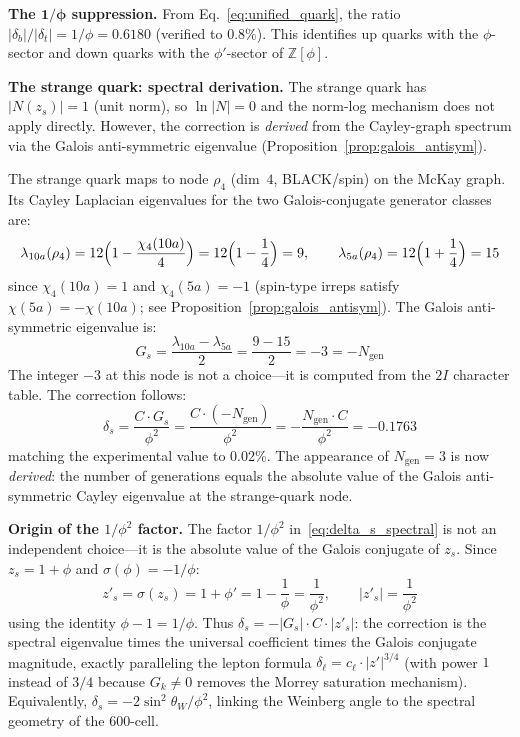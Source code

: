 \documentclass[12pt,a4paper]{article}
\theoremstyle{definition}
\begin{document}
\textbf{The $\mathbf{1/\phi}$ suppression.} From Eq.~\eqref{eq:unified_quark}, the ratio $|\delta_b|/|\delta_t| = 1/\phi = 0.6180$ (verified to $0.8\%$).  This identifies up quarks with the $\phi$-sector and down quarks with the $\phi'$-sector of $\mathbb{Z}[\phi]$.

\textbf{The strange quark: spectral derivation.} The strange quark has $|N(z_s)| = 1$ (unit norm), so $\ln|N| = 0$ and the norm-log mechanism does not apply directly.  However, the correction is \emph{derived} from the Cayley-graph spectrum via the Galois anti-symmetric eigenvalue (Proposition~\ref{prop:galois_antisym}).

The strange quark maps to node $\rho_4$ (dim~$4$, BLACK/spin) on the McKay graph.  Its Cayley Laplacian eigenvalues for the two Galois-conjugate generator classes are:
\begin{equation}
\lambda_{10a}(\rho_4) = 12\Bigl(1 - \frac{\chi_4(10a)}{4}\Bigr) = 12\Bigl(1 - \frac{1}{4}\Bigr) = 9, \qquad
\lambda_{5a}(\rho_4) = 12\Bigl(1 + \frac{1}{4}\Bigr) = 15
\end{equation}
since $\chi_4(10a) = 1$ and $\chi_4(5a) = -1$ (spin-type irreps satisfy $\chi(5a) = -\chi(10a)$; see Proposition~\ref{prop:galois_antisym}).  The Galois anti-symmetric eigenvalue is:
\begin{equation}
G_s = \frac{\lambda_{10a} - \lambda_{5a}}{2} = \frac{9 - 15}{2} = -3 = -N_{\text{gen}}
\end{equation}
The integer $-3$ at this node is not a choice---it is computed from the $2I$ character table.  The correction follows:
\begin{equation}
\boxed{\delta_s = \frac{C \cdot G_s}{\phi^2} = \frac{C \cdot (-N_{\text{gen}})}{\phi^2} = -\frac{N_{\text{gen}} \cdot C}{\phi^2} = -0.1763}
\label{eq:delta_s_spectral}
\end{equation}
matching the experimental value to $0.02\%$.  The appearance of $N_{\text{gen}} = 3$ is now \emph{derived}: the number of generations equals the absolute value of the Galois anti-symmetric Cayley eigenvalue at the strange-quark node.

\textbf{Origin of the $1/\phi^2$ factor.}  The factor $1/\phi^2$ in~\eqref{eq:delta_s_spectral} is not an independent choice---it is the absolute value of the Galois conjugate of $z_s$.  Since $z_s = 1 + \phi$ and $\sigma(\phi) = -1/\phi$:
\begin{equation}
z'_s = \sigma(z_s) = 1 + \phi' = 1 - \frac{1}{\phi} = \frac{1}{\phi^2}, \qquad |z'_s| = \frac{1}{\phi^2}
\label{eq:zs_galois}
\end{equation}
using the identity $\phi - 1 = 1/\phi$.  Thus $\delta_s = -|G_s|\cdot C \cdot |z'_s|$: the correction is the spectral eigenvalue times the universal coefficient times the Galois conjugate magnitude, exactly paralleling the lepton formula $\delta_\ell = c_\ell \cdot |z'|^{3/4}$ (with power $1$ instead of $3/4$ because $G_k \neq 0$ removes the Morrey saturation mechanism).  Equivalently, $\delta_s = -2\sin^2\theta_W/\phi^2$, linking the Weinberg angle to the spectral geometry of the 600-cell.
\end{document}
